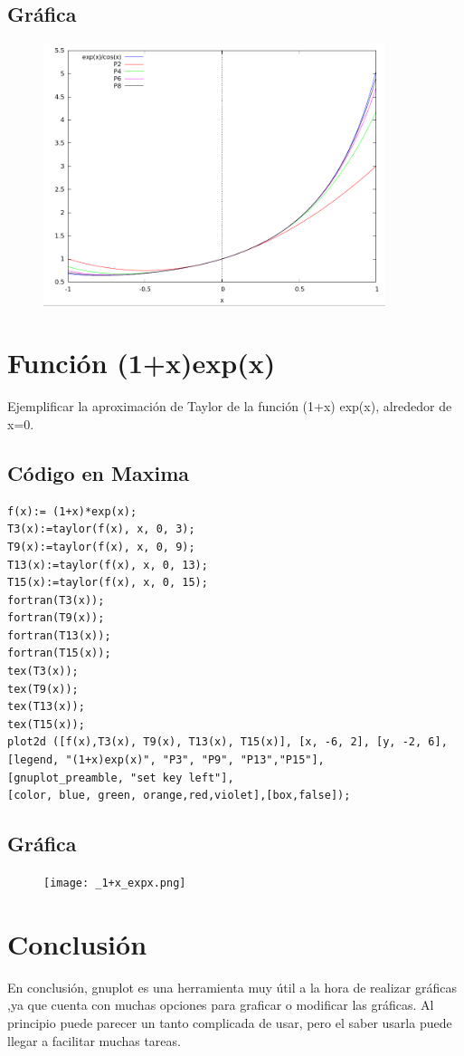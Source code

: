 \documentclass[a4paper]{article}
\begin{document}
\subsection{Gráfica}

\begin{figure}[h]
\centering
\includegraphics[width=10cm]{exp_cos.png}
\end{figure}

\section{Función (1+x)exp(x)}
Ejemplificar la aproximación de Taylor de la función (1+x) exp(x), alrededor de x=0.

\subsection{Código en Maxima}

 \begin{verbatim}
f(x):= (1+x)*exp(x);
T3(x):=taylor(f(x), x, 0, 3);
T9(x):=taylor(f(x), x, 0, 9);
T13(x):=taylor(f(x), x, 0, 13);
T15(x):=taylor(f(x), x, 0, 15);
fortran(T3(x));
fortran(T9(x));
fortran(T13(x));
fortran(T15(x));
tex(T3(x));
tex(T9(x));
tex(T13(x));
tex(T15(x));
plot2d ([f(x),T3(x), T9(x), T13(x), T15(x)], [x, -6, 2], [y, -2, 6],
[legend, "(1+x)exp(x)", "P3", "P9", "P13","P15"],
[gnuplot_preamble, "set key left"],
[color, blue, green, orange,red,violet],[box,false]);
\end{verbatim}

\subsection{Gráfica}

\begin{figure}[h]
\centering
\texttt{[image: \_1+x\_expx.png]}
\end{figure}

\section{Conclusión}
En conclusión, gnuplot es una herramienta muy útil a la hora de realizar gráficas ,ya que cuenta con muchas opciones para graficar o modificar las gráficas. Al principio puede parecer un tanto complicada de usar, pero el saber usarla puede llegar a facilitar muchas tareas.
\end{document}
